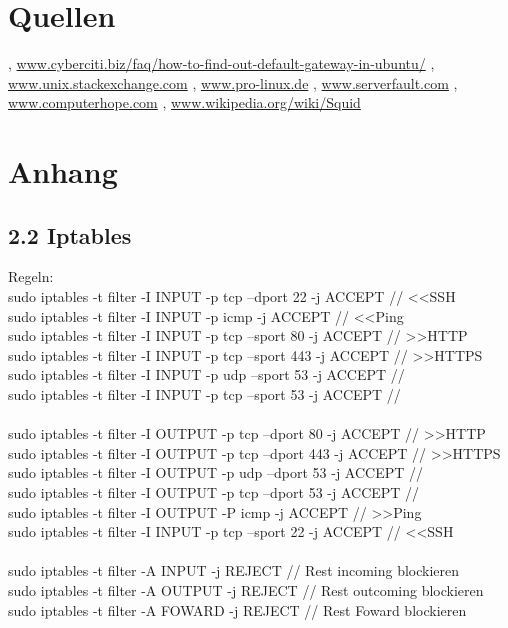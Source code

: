 \documentclass[12pt]{article}
\theoremstyle{plain}
\begin{document}
\section{Quellen}
\begin{thebibliography}{50}
\bibitem  [Cyberciti], \url{www.cyberciti.biz/faq/how-to-find-out-default-gateway-in-ubuntu/}
\bibitem [Stackexchange] , \url{www.unix.stackexchange.com}
, \url{www.pro-linux.de}
\bibitem [Serverfault], \url{www.serverfault.com}
\bibitem [computerhope], \url{www.computerhope.com}
\bibitem[Wikipedia], \url{www.wikipedia.org/wiki/Squid}
\end{thebibliography}
\section{Anhang}
\subsection*{2.2 Iptables}
Regeln:\\
sudo iptables -t filter -I INPUT -p tcp --dport 22 -j ACCEPT // <<SSH \\
sudo iptables -t filter -I INPUT -p icmp -j ACCEPT // <<Ping \\
sudo iptables -t filter -I INPUT -p tcp --sport 80 -j ACCEPT // >>HTTP \\
sudo iptables -t filter -I INPUT -p tcp --sport 443 -j ACCEPT // >>HTTPS\\
sudo iptables -t filter -I INPUT -p udp --sport 53 -j ACCEPT //\\
sudo iptables -t filter -I INPUT -p tcp --sport 53 -j ACCEPT //\\
\\
sudo iptables -t filter -I OUTPUT -p tcp --dport 80 -j ACCEPT // >>HTTP \\
sudo iptables -t filter -I OUTPUT -p tcp --dport 443 -j ACCEPT // >>HTTPS\\
sudo iptables -t filter -I OUTPUT -p udp --dport 53 -j ACCEPT //\\
sudo iptables -t filter -I OUTPUT -p tcp --dport 53 -j ACCEPT //\\
sudo iptables -t filter -I OUTPUT -P icmp -j ACCEPT // >>Ping \\
sudo iptables -t filter -I INPUT -p tcp --sport 22 -j ACCEPT // <<SSH \\
\\
sudo iptables -t filter -A INPUT -j REJECT // Rest incoming blockieren \\
sudo iptables -t filter -A OUTPUT -j REJECT // Rest outcoming blockieren \\
sudo iptables -t filter -A FOWARD -j REJECT // Rest Foward blockieren \\
\end{document}

